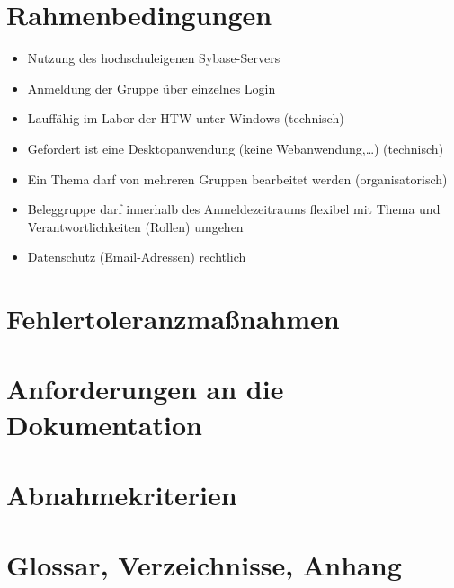 \part{Rahmenbedingungen}
\begin{itemize}
\item Nutzung des hochschuleigenen Sybase-Servers
\item Anmeldung der Gruppe über einzelnes Login
\item Lauffähig im Labor der HTW unter Windows (technisch)
\item Gefordert ist eine Desktopanwendung (keine Webanwendung,…) (technisch)
\item Ein Thema darf von mehreren Gruppen bearbeitet werden (organisatorisch)
\item Beleggruppe darf innerhalb des Anmeldezeitraums flexibel mit Thema und Verantwortlichkeiten (Rollen) umgehen
\item Datenschutz (Email-Adressen) rechtlich
\end{itemize}

\part{Fehlertoleranzmaßnahmen}


\part{Anforderungen an die Dokumentation}


\part{Abnahmekriterien}


\part{Glossar, Verzeichnisse, Anhang}

